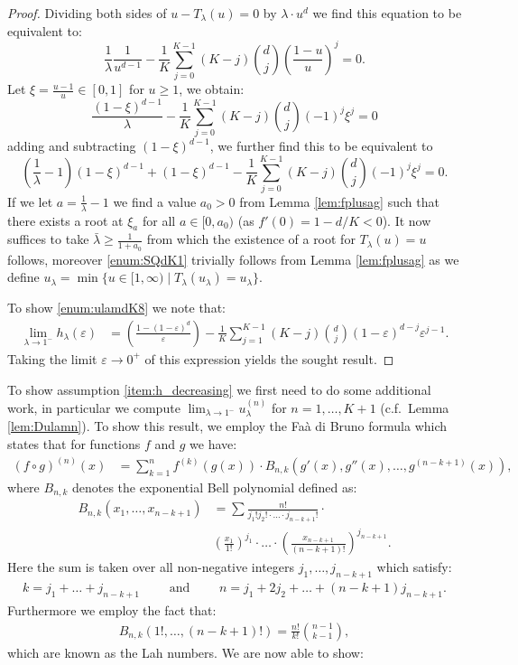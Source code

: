 \documentclass[12pt]{report}
\begin{document}
\begin{proof}
Dividing both sides of $u-T_\lambda(u)=0$ by $\lambda \cdot u^d$ we find this equation to be equivalent to:
$$
\frac{1}{\lambda}\frac{1}{u^{d-1}} - \frac{1}{K} \sum_{j=0}^{K-1} (K-j) \binom{d}{j} \left( \frac{1-u}{u} \right)^j = 0.
$$
Let $\xi = \frac{u-1}{u} \in [0,1]$ for $u \geq 1$, we obtain:
$$
\frac{(1-\xi)^{d-1}}{\lambda} - \frac{1}{K} \sum_{j=0}^{K-1} (K-j) \binom{d}{j} (-1)^j \xi^j
=0
$$
adding and subtracting $(1-\xi)^{d-1}$, we further find this to be equivalent to
$$
\left( \frac{1}{\lambda} - 1 \right) (1-\xi)^{d-1} + (1-\xi)^{d-1} - \frac{1}{K} \sum_{j=0}^{K-1} (K-j) \binom{d}{j} (-1)^j \xi^j = 0.
$$
If we let $a=\frac{1}{\lambda} - 1$ we find a value $a_0>0$ from Lemma \ref{lem:fplusag} such that there exists a root at $\xi_a$ for all $a \in [0,a_0)$ (as $f'(0)=1-d/K < 0$).
 It now suffices to take $\bar \lambda \geq \frac{1}{1+a_0}$ from which the existence of a root for $T_\lambda(u)=u$ follows, moreover \ref{enum:SQdK1} trivially follows from Lemma \ref{lem:fplusag} as we define $u_\lambda=\min\{u \in [1,\infty) \mid T_{\lambda}(u_\lambda)=u_\lambda \}$.

To show \ref{enum:ulamdK8} we note that:
\begin{align*}
\lim_{\lambda \rightarrow 1^-} h_{\lambda}(\varepsilon)
&= \left( \frac{1-(1-\varepsilon)^d}{\varepsilon} \right) - \frac{1}{K} \sum_{j=1}^{K-1} (K-j) \binom{d}{j} (1-\varepsilon)^{d-j} \varepsilon^{j-1}.
\end{align*}
Taking the limit $\varepsilon \rightarrow 0^+$ of this expression yields the sought result.
\end{proof}

To show assumption \ref{item:h_decreasing} we first need to do some additional work, in particular we compute $\lim_{\lambda \rightarrow 1^-} u_{\lambda}^{(n)}$ for $n=1,\dots,K+1$ (c.f.~Lemma \ref{lem:Dulamn}). To show this result, we employ the Fa\`a di Bruno formula which states that for functions $f$ and $g$ we have:
\begin{align*}
(f\circ g)^{(n)}(x)
&=
\sum_{k=1}^n f^{(k)}(g(x)) \cdot B_{n,k}(g'(x),g''(x),\dots, g^{(n-k+1)}(x)),
\end{align*}
where $B_{n,k}$ denotes the exponential Bell polynomial defined as:
\begin{align*}
B_{n,k}(x_1,\dots,x_{n-k+1})
&=
\sum \frac{n!}{j_1!j_2! \cdot \dots \cdot j_{n-k+1}!} \cdot \\
& \left( \frac{x_1}{1!} \right)^{j_1} \cdot \dots \cdot \left( \frac{x_{n-k+1}}{(n-k+1)!} \right)	^{j_{n-k+1}}.
\end{align*}
Here the sum is taken over all non-negative integers $j_1,\dots, j_{n-k+1}$ which satisfy:
\begin{align*}
k =j_1+\dots+j_{n-k+1}
\qquad \mbox{ and } \qquad n =j_1+2j_2+\dots+(n-k+1)j_{n-k+1}.
\end{align*}
Furthermore we employ the fact that:
\begin{align}\label{eq:Lah}
B_{n,k}(1!,\dots,(n-k+1)!)=\frac{n!}{k!} \binom{n-1}{k-1},
\end{align}
which are known as the Lah numbers. We are now able to show:
\end{document}
